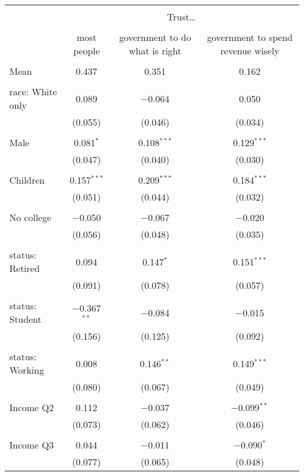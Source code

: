 
\begin{tabular}{@{\extracolsep{5pt}}lccc} 
\\[-1.8ex]\hline 
\hline \\[-1.8ex] 
 & \multicolumn{3}{c}{Trust…} \\ 
\cline{2-4} 
\\[-1.8ex] & most people & government to do what is right & government to spend revenue wisely \\ 
\hline \\[-1.8ex] 
 Mean & 0.437 & 0.351 & 0.162  \\ \hline \\[-1.8ex] race: White only & 0.089 & $-$0.064 & 0.050 \\ 
  & (0.055) & (0.046) & (0.034) \\ 
  & & & \\ 
 Male & 0.081$^{*}$ & 0.108$^{***}$ & 0.129$^{***}$ \\ 
  & (0.047) & (0.040) & (0.030) \\ 
  & & & \\ 
 Children & 0.157$^{***}$ & 0.209$^{***}$ & 0.184$^{***}$ \\ 
  & (0.051) & (0.044) & (0.032) \\ 
  & & & \\ 
 No college & $-$0.050 & $-$0.067 & $-$0.020 \\ 
  & (0.056) & (0.048) & (0.035) \\ 
  & & & \\ 
 status: Retired & 0.094 & 0.147$^{*}$ & 0.151$^{***}$ \\ 
  & (0.091) & (0.078) & (0.057) \\ 
  & & & \\ 
 status: Student & $-$0.367$^{**}$ & $-$0.084 & $-$0.015 \\ 
  & (0.156) & (0.125) & (0.092) \\ 
  & & & \\ 
 status: Working & 0.008 & 0.146$^{**}$ & 0.149$^{***}$ \\ 
  & (0.080) & (0.067) & (0.049) \\ 
  & & & \\ 
 Income Q2 & 0.112 & $-$0.037 & $-$0.099$^{**}$ \\ 
  & (0.073) & (0.062) & (0.046) \\ 
  & & & \\ 
 Income Q3 & 0.044 & $-$0.011 & $-$0.090$^{*}$ \\ 
  & (0.077) & (0.065) & (0.048) \\ 

\end{tabular}
